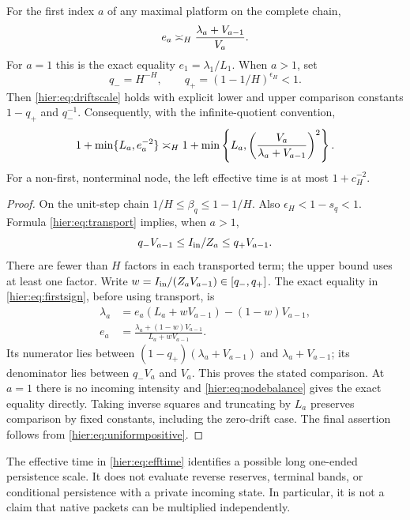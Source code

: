 \begin{theorem}\label{hier:thm:effectivetime}
For the first index $a$ of any maximal platform on the complete
chain,
\begin{equation}
 e_a\asymp_H\frac{\lambda_a+V_{a-1}}{V_a}.
 \label{hier:eq:driftscale}
\end{equation}
For $a=1$ this is the exact equality $e_1=\lambda_1/L_1$.
When $a>1$, set
\[
 q_-=H^{-H},\qquad q_+=(1-1/H)^{\epsilon_H}<1.
\]
Then \eqref{hier:eq:driftscale} holds with explicit lower and upper
comparison constants $1-q_+$ and $q_-^{-1}$.
Consequently, with the infinite-quotient convention,
\begin{equation}
 1+\min\{L_a,e_a^{-2}\}
 \asymp_H
 1+\min\left\{L_a,
       \left(\frac{V_a}{\lambda_a+V_{a-1}}\right)^2\right\}.
 \label{hier:eq:efftime}
\end{equation}
For a non-first, nonterminal node, the left effective time is at
most $1+c_H^{-2}$.
\end{theorem}
\begin{proof}
On the unit-step chain $1/H\le\beta_q\le1-1/H$. Also
$\epsilon_H<1-s_q<1$. Formula \eqref{hier:eq:transport} implies, when
$a>1$,
\[
 q_-V_{a-1}\le I_{\rm in}/Z_a\le q_+V_{a-1}.
\]
There are fewer than $H$ factors in each transported term; the
upper bound uses at least one factor. Write
$w=I_{\rm in}/(Z_aV_{a-1})\in[q_-,q_+]$. The exact equality in
\eqref{hier:eq:firstsign}, before using transport, is
\begin{align}
 \lambda_a&=e_a(L_a+wV_{a-1})-(1-w)V_{a-1},\\
 e_a&=\frac{\lambda_a+(1-w)V_{a-1}}{L_a+wV_{a-1}}.
 \label{hier:eq:exactfirst}
\end{align}
Its numerator lies between
$(1-q_+)(\lambda_a+V_{a-1})$ and $\lambda_a+V_{a-1}$;
its denominator lies between $q_-V_a$ and $V_a$. This proves the
stated comparison. At $a=1$ there is no incoming intensity and
\eqref{hier:eq:nodebalance} gives the exact equality directly.
Taking inverse squares and truncating by $L_a$ preserves comparison
by fixed constants, including the zero-drift case. The final assertion
follows from \eqref{hier:eq:uniformpositive}.
\end{proof}

\begin{remark}
The effective time in \eqref{hier:eq:efftime} identifies a possible long
one-ended persistence scale. It does not evaluate reverse reserves,
terminal bands, or conditional persistence with a private incoming
state. In particular, it is not a claim that native packets can be
multiplied independently.
\end{remark}

